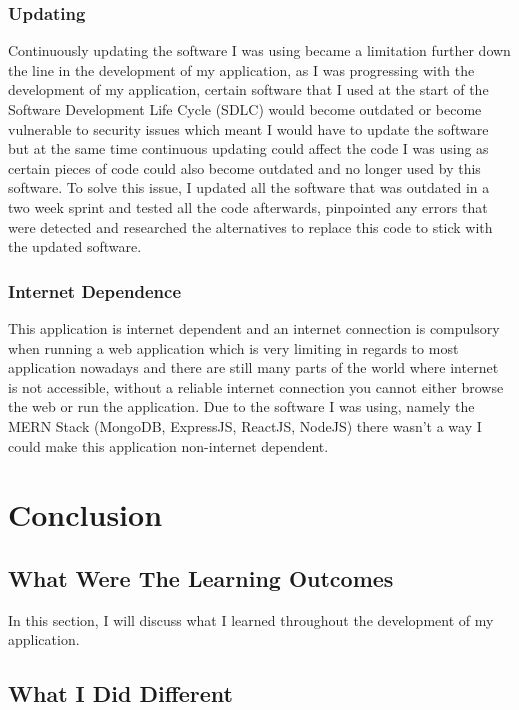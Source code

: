 \subsection{Updating}

Continuously updating the software I was using became a limitation further down the line in the development of my application, as I was progressing with the development of my application, certain software that I used at the start of the Software Development Life Cycle (SDLC) would become outdated or become vulnerable to security issues which meant I would have to update the software but at the same time continuous updating could affect the code I was using as certain pieces of code could also become outdated and no longer used by this software. To solve this issue, I updated all the software that was outdated in a two week sprint and tested all the code afterwards, pinpointed any errors that were detected and researched the alternatives to replace this code to stick with the updated software.

\subsection{Internet Dependence}

This application is internet dependent and an internet connection is compulsory when running a web application which is very limiting in regards to most application nowadays and there are still many parts of the world where internet is not accessible, without a reliable internet connection you cannot either browse the web or run the application. Due to the software I was using, namely the MERN Stack (MongoDB, ExpressJS, ReactJS, NodeJS) there wasn't a way I could make this application non-internet dependent. 

\chapter{Conclusion}

\section{What Were The Learning Outcomes}

In this section, I will discuss what I learned throughout the development of my application.

\section{What I Did Different}

